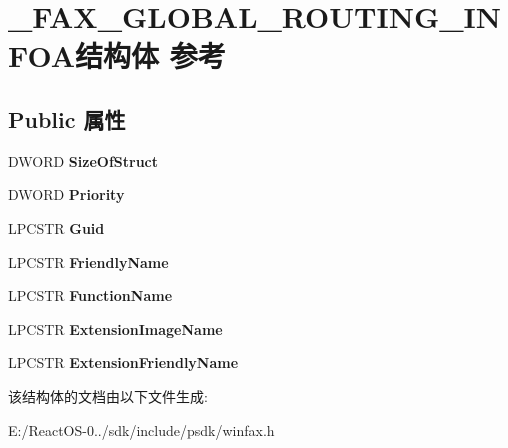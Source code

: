 \hypertarget{struct___f_a_x___g_l_o_b_a_l___r_o_u_t_i_n_g___i_n_f_o_a}{}\section{\+\_\+\+F\+A\+X\+\_\+\+G\+L\+O\+B\+A\+L\+\_\+\+R\+O\+U\+T\+I\+N\+G\+\_\+\+I\+N\+F\+O\+A结构体 参考}
\label{struct___f_a_x___g_l_o_b_a_l___r_o_u_t_i_n_g___i_n_f_o_a}
\subsection*{Public 属性}
\begin{DoxyCompactItemize}
\item 
\mbox{\label{struct___f_a_x___g_l_o_b_a_l___r_o_u_t_i_n_g___i_n_f_o_a_adbd0876e327aff2080e7100915ad7430}} 
D\+W\+O\+RD {\bfseries Size\+Of\+Struct}
\item 
\mbox{\label{struct___f_a_x___g_l_o_b_a_l___r_o_u_t_i_n_g___i_n_f_o_a_af8327578da4b15cb5c16663a263d9982}} 
D\+W\+O\+RD {\bfseries Priority}
\item 
\mbox{\label{struct___f_a_x___g_l_o_b_a_l___r_o_u_t_i_n_g___i_n_f_o_a_a4a256270b674c0d32e53b74b4306b139}} 
L\+P\+C\+S\+TR {\bfseries Guid}
\item 
\mbox{\label{struct___f_a_x___g_l_o_b_a_l___r_o_u_t_i_n_g___i_n_f_o_a_a2bd624ec5184d3a063c21d70fe8b2609}} 
L\+P\+C\+S\+TR {\bfseries Friendly\+Name}
\item 
\mbox{\label{struct___f_a_x___g_l_o_b_a_l___r_o_u_t_i_n_g___i_n_f_o_a_ac7318f2503fb2dc6d007d52f94e2be38}} 
L\+P\+C\+S\+TR {\bfseries Function\+Name}
\item 
\mbox{\label{struct___f_a_x___g_l_o_b_a_l___r_o_u_t_i_n_g___i_n_f_o_a_a56c66aa4b1c7102c28d56a81274a831c}} 
L\+P\+C\+S\+TR {\bfseries Extension\+Image\+Name}
\item 
\mbox{\label{struct___f_a_x___g_l_o_b_a_l___r_o_u_t_i_n_g___i_n_f_o_a_a6e1eb8aa8749fa789a2379b42c4ac91c}} 
L\+P\+C\+S\+TR {\bfseries Extension\+Friendly\+Name}
\end{DoxyCompactItemize}


该结构体的文档由以下文件生成\+:\begin{DoxyCompactItemize}
\item 
E\+:/\+React\+O\+S-\/0../sdk/include/psdk/winfax.\+h\end{DoxyCompactItemize}
